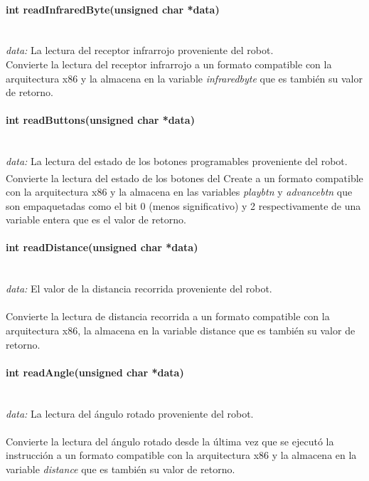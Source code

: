 \documentclass[letterpaper,openright,12pt]{book}
\begin{document}
\paragraph{int readInfraredByte(unsigned char *data)}\mbox{}\\
\emph{data: }La lectura del receptor infrarrojo proveniente del robot.\\
Convierte la lectura del receptor infrarrojo a un formato compatible con la arquitectura x86 y la almacena en la variable \emph{infraredbyte} que es también su valor de retorno.\\ 

\paragraph{int readButtons(unsigned char *data)}\mbox{}\\
\emph{data: }La lectura del estado de los botones programables proveniente del robot.\\
Convierte la lectura del estado de los botones del Create\textsuperscript{\textregistered} a un formato compatible con la arquitectura x86 y la almacena en las variables \emph{playbtn} y \emph{advancebtn} que son empaquetadas como el bit 0 (menos significativo) y 2 respectivamente de una variable entera que es el valor de retorno.\\ 

\paragraph{int readDistance(unsigned char *data)}\mbox{}\\
\emph{data: }El valor de la distancia recorrida proveniente del robot.\\\\
Convierte la lectura de distancia recorrida a un formato compatible con la arquitectura x86, la almacena en la variable distance que es también su valor de retorno.\\ 

\paragraph{int readAngle(unsigned char *data)}\mbox{}\\
\emph{data: }La lectura del ángulo rotado proveniente del robot.\\\\
Convierte la lectura del ángulo rotado desde la última vez que se ejecutó la instrucción a un formato compatible con la arquitectura x86 y la almacena en la variable \emph{distance} que es también su valor de retorno.\\ 
\end{document}
